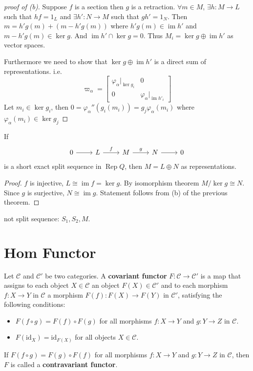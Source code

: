 \documentclass[11pt, a4paper]{report}
\begin{document}
\begin{proof}[proof of (b)] 
Suppose $ f $ is a section then $ g $ is a retraction. $ \forall m \in M $, $ \exists h: M\to L $ such that $ hf=1_L $ and $ \exists h': N\to M $ such that $ gh'=1_N $. Then $ m=h'g(m)+(m-h'g(m)) $ where $ h'g(m) \in \operatorname{im}h' $ and $ m-h'g(m) \in \operatorname{ker}g $. And $ \operatorname{im}h' \cap \operatorname{ker}g = 0 $. Thus $ M_i = \operatorname{ker}g \oplus \operatorname{im}h' $ as vector spaces.

Furthermore we need to show that $ \operatorname{ker}g \oplus \operatorname{im}h' $ is a direct sum of representations. i.e. 
\[
\varpi_\alpha=\begin{bmatrix}
\varphi_\alpha |_{\operatorname{ker}g_i } & 0 \\
0 & \varphi_\alpha |_{\operatorname{im}h'_i }
\end{bmatrix}
\]
Let $ m_i \in \operatorname{ker}g_i $, then $ 0=\varphi_\alpha''(g_i(m_i))=g_j \varphi_\alpha  (m_i) $ where $ \varphi_\alpha (m_i) \in \operatorname{ker}g_j $   
\end{proof}

\begin{corollary}
If 
\[
\begin{tikzcd}
0 \arrow[r] & L \arrow[r, "f"] & M \arrow[r, "g"] & N \arrow[r] & 0
\end{tikzcd}
\]
is a short exact split sequence in $ \operatorname{Rep}Q $, then $ M = L \oplus N $ as representations.
\end{corollary}

\begin{proof} 
$ f $ is injective, $ L \cong \operatorname{im}f = \operatorname{ker}g $. By isomorphism theorem $ M  / \operatorname{ker}g \cong N$. Since $ g $ is surjective, $ N \cong \operatorname{im}g $. Statement follows from (b) of the previous theorem.
\end{proof}

\begin{example} 
not split sequence: $S_1, S_2, M$.
\end{example}

\section{Hom Functor}

Let $ \mathcal{C} $ and $ \mathcal{C}' $ be two categories. A \textbf{covariant functor} $ F: \mathcal{C} \to \mathcal{C}' $ is a map that assigns to each object $ X \in \mathcal{C} $ an object $ F(X) \in \mathcal{C}' $ and to each morphism $ f: X \to Y $ in $ \mathcal{C} $ a morphism $ F(f): F(X) \to F(Y) $ in $ \mathcal{C}' $, satisfying the following conditions:
\begin{itemize}
    \item $ F(f \circ g) = F(f) \circ F(g) $ for all morphisms $ f: X \to Y $ and $ g: Y \to Z $ in $ \mathcal{C} $.
    \item $ F(\mathrm{id}_X) = \mathrm{id}_{F(X)} $ for all objects $ X \in \mathcal{C} $.
\end{itemize}
If $ F(f \circ g) =F(g) \circ F(f) $ for all morphisms $ f: X \to Y $ and $ g: Y \to Z $ in $ \mathcal{C} $, then $ F $ is called a \textbf{contravariant functor}.
\end{document}
